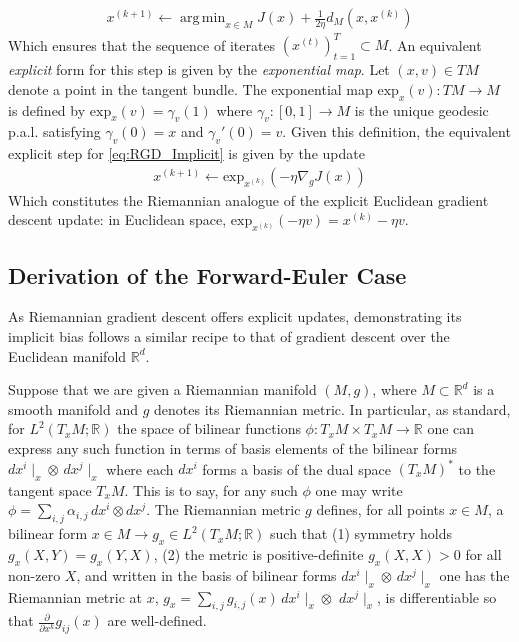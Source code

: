\documentclass[reqno,11pt,letterpaper]{amsart}
\theoremstyle{plain}
\theoremstyle{definition}
\theoremstyle{remark}
\newcommand{\rgrad}{\nabla_{\!g}}
\DeclareMathOperator*{\argmin}{arg\,min}
\begin{document}
\begin{align}\label{eq:RGD_Implicit}
    x^{(k+1)} \gets \argmin_{x \in M} J(x) + \frac{1}{2\eta} d_{M}(x, x^{(k)})
\end{align}
Which ensures that the sequence of iterates $(x^{(t)})_{t=1}^{T} \subset M$. An equivalent \emph{explicit} form for this step is given by the \emph{exponential map}. Let $(x, v) \in TM$ denote a point in the tangent bundle. The exponential map $\mathrm{exp}_{x}(v): T M \to M$ is defined by $\mathrm{exp}_{x}(v) = \gamma_{v}(1)$ where $\gamma_{v}: [0,1] \to M$ is the unique geodesic p.a.l. satisfying $\gamma_{v}(0) = x$ and $\gamma_{v}'(0) = v$. Given this definition, the equivalent explicit step for \ref{eq:RGD_Implicit} is given by the update
\begin{align}\label{eq:RGD_Explicit}
    x^{(k+1)} \gets \mathrm{exp}_{x^{(k)}} \left(
    -\eta \rgrad J (x)
    \right)
\end{align}
Which constitutes the Riemannian analogue of the explicit Euclidean gradient descent update: in Euclidean space, $\mathrm{exp}_{x^{(k)}}(-\eta v) = x^{(k)} - \eta v$.

\subsection{Derivation of the Forward-Euler Case}

As Riemannian gradient descent offers explicit updates, demonstrating its implicit bias follows a similar recipe to that of gradient descent over the Euclidean manifold $\mathbb{R}^{d}$.

Suppose that we are given a Riemannian manifold $(M, g)$, where $M \subset \mathbb{R}^{d}$ is a smooth manifold and $g$ denotes its Riemannian metric. In particular, as standard, for $L^{2}(T_{x} M; \mathbb{R})$ the space of bilinear functions $\phi: T_{x} M \times T_{x} M \to \mathbb{R}$ one can express any such function in terms of basis elements of the bilinear forms $dx^{i} \mid_{x} \otimes \, d x^{j} \mid_{x}$ where each $dx^{i}$ forms a basis of the dual space $(T_{x} M)^{*}$ to the tangent space $T_{x} M$. This is to say, for any such $\phi$ one may write $\phi = \sum_{i,j} \alpha_{i,j} \, dx^{i} \otimes dx^{j}$. The Riemannian metric $g$ defines, for all points $x \in M$, a bilinear form $x \in M \to g_{x} \in L^{2}(T_{x} M; \mathbb{R})$ such that (1) symmetry holds $g_{x}(X,Y) = g_{x}(Y,X)$, (2) the metric is positive-definite $g_{x}(X,X) > 0$ for all non-zero $X$, and written in the basis of bilinear forms $dx^{i} \mid_{x} \otimes \, d x^{j} \mid_{x}$ one has the Riemannian metric at $x$, $g_{x} = \sum_{i,j} g_{i,j} (x)\, dx^{i} \mid_{x} \otimes \,\, dx^{j} \mid_{x}$, is differentiable so that $\frac{\partial}{\partial x^{k}} g_{ij}(x)$ are well-defined.
\end{document}

